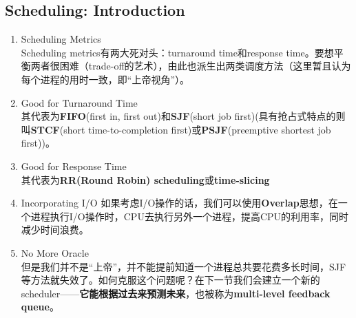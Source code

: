 \documentclass{article}
\begin{document}
\subsection{Scheduling: Introduction}
\begin{enumerate}
    \item Scheduling Metrics \\ 
    Scheduling metrics有两大死对头：turnaround time和response time。要想平衡两者很困难（trade-off的艺术），由此也派生出两类调度方法（这里暂且认为每个进程的用时一致，即“上帝视角”）。
    \item Good for Turnaround Time \\
    其代表为\textbf{FIFO}(first in, first out)和\textbf{SJF}(short job first)(具有抢占式特点的则叫\textbf{STCF}(short time-to-completion first)或\textbf{PSJF}(preemptive shortest job first))。
    \item Good for Response Time \\
    其代表为\textbf{RR(Round Robin) scheduling}或\textbf{time-slicing}
    \item Incorporating I/O
    如果考虑I/O操作的话，我们可以使用\textbf{Overlap}思想，在一个进程执行I/O操作时，CPU去执行另外一个进程，提高CPU的利用率，同时减少时间浪费。
    \item No More Oracle \\
    但是我们并不是“上帝”，并不能提前知道一个进程总共要花费多长时间，SJF等方法就失效了。如何克服这个问题呢？在下一节我们会建立一个新的scheduler——\textbf{它能根据过去来预测未来}，也被称为\textbf{multi-level feedback queue}。
\end{enumerate}
\end{document}
